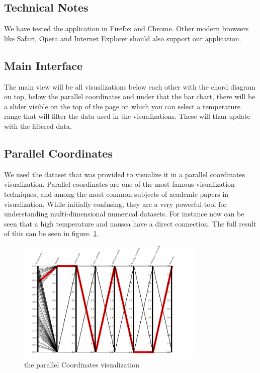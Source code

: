 \documentclass[a4paper,twoside,11pt]{article}
\begin{document}
\subsection{Technical Notes}
We have tested the application in Firefox and Chrome. Other modern browsers like Safari, Opera and Internet Explorer should also support our application.
\subsection{Main Interface}
The main view will be all visualizations below each other with the chord diagram on top, below the parallel coordinates and under that the bar chart, there will be a slider visible on the top of the page on which you can select a temperature range that will filter the data used in the visualizations. These will than update with the filtered data.
\newpage
\subsection{Parallel Coordinates}
We used the dataset that was provided to visualize it in a parallel coordinates visualization. Parallel coordinates are one of the most famous visualization techniques, and among the most common subjects of academic papers in visualization. While initially confusing, they are a very powerful tool for understanding multi-dimensional numerical datasets. \newline
For instance now can be seen that a high temperature and nausea have a direct connection. The full result of this can be seen in figure. \ref{fig:Parallel}.
\begin{figure}[h]
\begin{center}
    \includegraphics[width=0.8\textwidth]{images/ParallelCoordinates.PNG}
    \caption{the parallel Coordinates visualization}
    \label{fig:Parallel}
\end{center}
\end{figure}
\newpage
\end{document}
